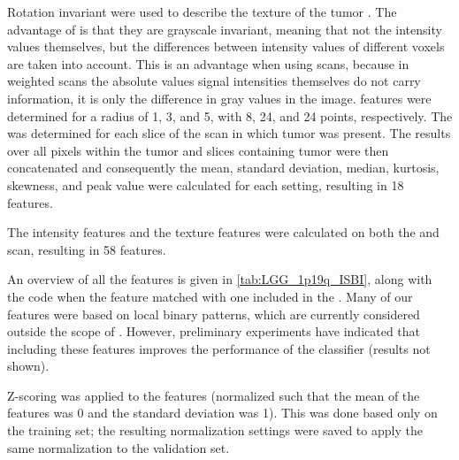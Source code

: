 \begin{subappendices}
Rotation invariant  were used to describe the texture of the \gls{tumor} \autocite{ojala2002multiresolution}.
The advantage of  is that they are grayscale invariant, meaning that not the intensity values themselves, but the differences between intensity values of different voxels are taken into account.
This is an advantage when using  scans, because in weighted  scans the absolute values signal intensities themselves do not carry information, it is only the difference in gray values in the image.
 features were determined for a radius of 1, 3, and 5, with 8, 24, and 24 points, respectively.
The  was determined for each slice of the  scan in which \gls{tumor} was present.
The results over all pixels within the \gls{tumor} and slices containing \gls{tumor} were then concatenated and consequently the mean, standard deviation, median, kurtosis, skewness, and peak value were calculated for each setting, resulting in 18  features.

The intensity features and the texture features were calculated on both the  and  scan, resulting in 58 features.

An overview of all the features is given in \cref{tab:LGG_1p19q_ISBI}, along with the  code when the feature matched with one included in the  \autocite{zwanenburg2016image}.
Many of our features were based on local binary patterns, which are currently considered outside the scope of .
However, preliminary experiments have indicated that including these features improves the performance of the classifier (results not shown).

Z-scoring was applied to the features (normalized such that the mean of the features was 0 and the standard deviation was 1).
This was done based only on the training set; the resulting normalization settings were saved to apply the same normalization to the validation set.


\end{subappendices}
